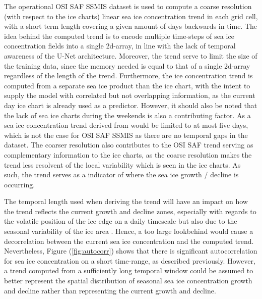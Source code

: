 \documentclass[../main/thesis.tex]{subfiles}
\begin{document}
The operational OSI SAF SSMIS dataset is used to compute a coarse resolution (with respect to the ice charts) linear sea ice concentration trend in each grid cell, with a short term length covering a given amount of days backwards in time. The idea behind the computed trend is to encode multiple time-steps of sea ice concentration fields into a single 2d-array, in line with the lack of temporal awareness of the U-Net architecture. Moreover, the trend serve to limit the size of the training data, since the memory needed is equal to that of a single 2d-array regardless of the length of the trend. Furthermore, the ice concentration trend is computed from a separate sea ice product than the ice chart, with the intent to supply the model with correlated but not overlapping information, as the current day ice chart is already used as a predictor. However, it should also be noted that the lack of sea ice charts during the weekends \citep{Dinessen2020} is also a contributing factor. As a sea ice concentration trend derived from \citet{Dinessen2020} would be limited to at most five days, which is not the case for OSI SAF SSMIS as there are no temporal gaps in the dataset. The coarser resolution also contributes to the OSI SAF trend serving as complementary information to the ice charts, as the coarse resolution makes the trend less resolvent of the local variability which is seen in the ice charts. As such, the trend serves as a indicator of where the sea ice growth / decline is occurring.

The temporal length used when deriving the trend will have an impact on how the trend reflects the current growth and decline zones, especially with regards to the volatile position of the ice edge on a daily timescale but also due to the seasonal variability of the ice area \citep{Holland2016}. Hence, a too large lookbehind would cause a decorrelation between the current sea ice concentration and the computed trend. Nevertheless, Figure (\ref{fig:autocorr}) shows that there is significant autocorrelation for sea ice concentration on a short time-range, as described previously. However, a trend computed from a sufficiently long temporal window could be assumed to better represent the spatial distribution of seasonal sea ice concentration growth and decline rather than representing the current growth and decline.
\end{document}
